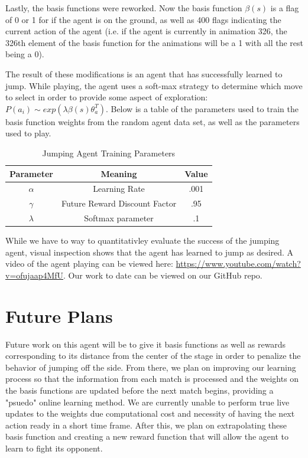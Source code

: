 \documentclass[11pt]{article}
\begin{document}
Lastly, the basis functions were reworked. Now the basis function $\beta(s)$ is a flag of 0 or 1 for if the agent is on the ground, as well as 400 flags indicating the current action of the agent (i.e. if the agent is currently in animation 326, the 326th element of the basis function for the animations will be a 1 with all the rest being a 0).

The result of these modifications is an agent that has successfully learned to jump. While playing, the agent uses a soft-max strategy to determine which move to select in order to provide some aspect of exploration: $P(a_i) \sim exp(\lambda\beta(s)\theta_a^T)$. Below is a table of the parameters used to train the basis function weights from the random agent data set, as well as the parameters used to play. 

\begin{table}[ht]
\caption{Jumping Agent Training Parameters} 
\centering 
\begin{tabular}{ c | c | c } 
\hline
Parameter & Meaning & Value \\
\hline %
$\alpha$  & Learning Rate & .001\\
$\gamma$ & Future Reward Discount Factor & .95\\
$\lambda$ & Softmax parameter & .1 \\
\hline 
\end{tabular}
\end{table}

While we have to way to quantitativley evaluate the success of the jumping agent, visual inspection shows that the agent has learned to jump as desired.  A video of the agent playing can be viewed here:  \url{https://www.youtube.com/watch?v=ofujaap4MfU}. Our work to date can be viewed on our GitHub repo.

\section{Future Plans}

Future work on this agent will be to give it basis functions as well as rewards corresponding to its distance from the center of the stage in order to penalize the behavior of jumping off the side. From there, we plan on improving our learning process so that the information from each match is processed and the weights on the basis functions are updated before the next match begins, providing a "psuedo" online learning method. We are currently unable to perform true live updates to the weights due computational cost and necessity of having the next action ready in a short time frame. After this, we plan on extrapolating these basis function and creating a new reward function that will allow the agent to learn to fight its opponent. 
\end{document}
